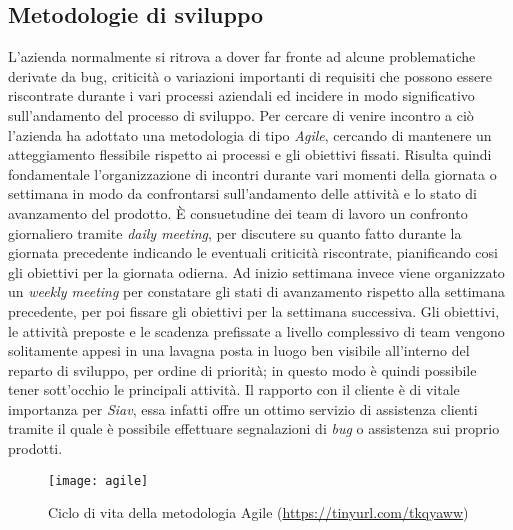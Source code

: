 \subsection{Metodologie di sviluppo}
L'azienda normalmente si ritrova a dover far fronte ad alcune problematiche derivate da bug, criticità o variazioni importanti di requisiti che possono essere riscontrate durante i vari processi aziendali ed incidere in modo significativo sull'andamento del processo di sviluppo.
Per cercare di venire incontro a ciò l'azienda ha adottato una metodologia di tipo \textit{Agile}, cercando di mantenere un atteggiamento flessibile rispetto ai processi e gli obiettivi fissati. Risulta quindi fondamentale l'organizzazione di incontri durante vari momenti della giornata o settimana in modo da confrontarsi sull'andamento delle attività e lo stato di avanzamento del prodotto. È consuetudine dei team di lavoro un confronto giornaliero tramite \textit{daily meeting}, per discutere su quanto fatto durante la giornata precedente indicando le eventuali criticità riscontrate, pianificando cosi gli obiettivi per la giornata odierna. Ad inizio settimana invece viene organizzato un \textit{weekly meeting} per constatare gli stati di avanzamento rispetto alla settimana precedente, per poi fissare gli obiettivi per la settimana successiva. Gli obiettivi, le attività preposte e le scadenza prefissate a livello complessivo di team vengono solitamente appesi in una lavagna posta in luogo ben visibile all'interno del reparto di sviluppo, per ordine di priorità; in questo modo è quindi possibile tener sott'occhio le principali attività. Il rapporto con il cliente è di vitale importanza per \textit{Siav}, essa infatti offre un ottimo servizio di assistenza clienti tramite il quale è possibile effettuare segnalazioni di \textit{bug} o assistenza sui proprio prodotti. 
\begin{figure}[!h] 
	\centering 
	\texttt{[image: agile]} 
	\caption{Ciclo di vita della metodologia Agile (\url{https://tinyurl.com/tkqyaww})}
\end{figure}
